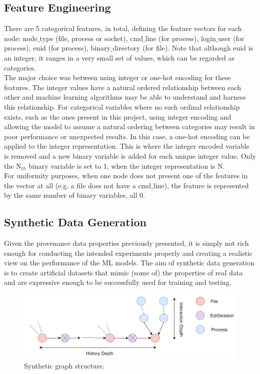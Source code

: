 \subsection{Feature Engineering}

There are 5 categorical features, in total, defining the feature vectors for each node: node$\_$type (file, process or socket), cmd$\_$line (for process), login$\_$user (for process), euid (for process), binary$\_$directory (for file). Note that although euid is an integer, it ranges in a very small set of values, which can be regarded as categories. \\


The major choice was between using integer or one-hot encoding for these features. The integer values have a natural ordered relationship between each other and machine learning algorithms may be able to understand and harness this relationship. For categorical variables where no such ordinal relationship exists, such as the ones present in this project, using integer encoding and allowing the model to assume a natural ordering between categories may result in poor performance or unexpected results. In this case, a one-hot encoding can be applied to the integer representation. This is where the integer encoded variable is removed and a new binary variable is added for each unique integer value. Only the N$_{th}$ binary variable is set to 1, when the integer representation is N. \\

For uniformity purposes, when one node does not present one of the features in the vector at all (e.g. a file does not have a cmd$\_$line), the feature is represented by the same number of binary variables, all 0. 

\subsection{Synthetic Data Generation} \label{Synthetic Data Generation}

Given the provenance data properties previously presented, it is simply not rich enough for conducting the intended experiments properly and creating a realistic view on the performance of the ML models. The aim of synthetic data generation is to create artificial datasets that mimic (some of) the properties of real data and are expressive enough to be successfully used for training and testing. 

\begin{figure}[H]
  \centering
  \centerline{\includegraphics[scale = 0.35]{Images/synth_dataset.png}}
  \caption{Synthetic graph structure.}
  \label{synth_dataset}
\end{figure}

